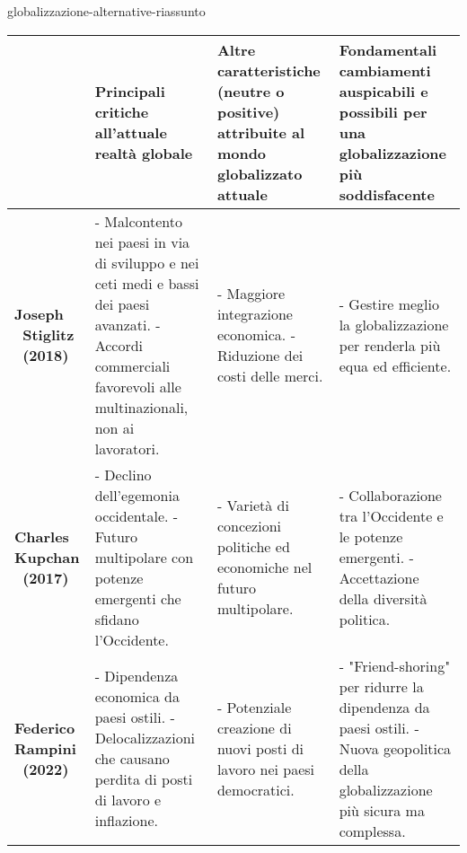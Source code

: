 \documentclass[preview]{standalone}
\begin{document}
\begin{snippet}{globalizzazione-alternative-riassunto}
    \phantom{}\\
    \begin{table*}[ht!]
        \centering
        \renewcommand{\arraystretch}{1.5}
        \begin{tabular}{| m{2cm} | m{4cm} | m{4cm} | m{4cm} |}
        \hline
        \textbf{} & \textbf{Principali critiche all'attuale realtà globale} & \textbf{Altre caratteristiche (neutre o positive) attribuite al mondo globalizzato attuale} & \textbf{Fondamentali cambiamenti auspicabili e possibili per una globalizzazione più soddisfacente} \\
        \hline
        \textbf{Joseph \ Stiglitz \ (2018)} & 
        - Malcontento nei paesi in via di sviluppo e nei ceti medi e bassi dei paesi avanzati. \newline
        - Accordi commerciali favorevoli alle multinazionali, non ai lavoratori. & 
        - Maggiore integrazione economica. \newline
        - Riduzione dei costi delle merci. & 
        - Gestire meglio la globalizzazione per renderla più equa ed efficiente. \\
        \hline
        \textbf{Charles Kupchan \ (2017)} & 
        - Declino dell'egemonia occidentale. \newline
        - Futuro multipolare con potenze emergenti che sfidano l'Occidente. & 
        - Varietà di concezioni politiche ed economiche nel futuro multipolare. & 
        - Collaborazione tra l'Occidente e le potenze emergenti. \newline
        - Accettazione della diversità politica. \\
        \hline
        \textbf{Federico Rampini \ (2022)} & 
        - Dipendenza economica da paesi ostili. \newline
        - Delocalizzazioni che causano perdita di posti di lavoro e inflazione. & 
        - Potenziale creazione di nuovi posti di lavoro nei paesi democratici. & 
        - "Friend-shoring" per ridurre la dipendenza da paesi ostili. \newline
        - Nuova geopolitica della globalizzazione più sicura ma complessa. \\
        \hline
        \end{tabular}
    \end{table*}
    \vspace{1cm}
\end{snippet}
\end{document}
